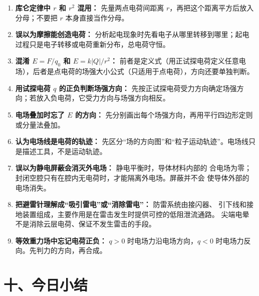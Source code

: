 \begin{mistakebox}
\begin{enumerate}
  \item \textbf{库仑定律中 $r$ 和 $r^2$ 混用：} 先量两点电荷间距离 $r$，再把这个距离平方后放入分母；不要把 $r$ 本身直接当作分母。

  \item \textbf{误以为摩擦能创造电荷：} 分析起电现象时先看电子从哪里转移到哪里；起电过程只是电子转移或电荷重新分布，总电荷守恒。

  \item \textbf{混淆 $E = F/q_0$ 和 $E = k|Q|/r^2$：} 前者是定义式（用正试探电荷定义任意电场），后者是点电荷的场强大小公式（只适用于点电荷），方向还要单独判断。

  \item \textbf{用试探电荷 $q$ 的正负判断场强方向：} 先按正试探电荷受力方向确定场强方向；若放入负电荷，它受力方向与场强方向相反。

  \item \textbf{电场叠加时忘了 $E$ 的方向：} 先分别画出每个场强方向，再用平行四边形定则或分量法叠加。

  \item \textbf{认为电场线是电荷的轨迹：} 先区分“场的方向图”和“粒子运动轨迹”。电场线只是描述工具，不是运动轨迹。

  \item \textbf{误以为静电屏蔽会消灭外电场：} 静电平衡时，导体材料内部的
  合电场为零；封闭空腔只有在腔内无电荷时，才能隔离外电场。屏蔽并不会
  使导体外部的电场消失。

  \item \textbf{把避雷针理解成“吸引雷电”或“消除雷电”：} 防雷系统由接闪器、
  引下线和接地装置组成，主要作用是在雷击发生时提供可控的低阻泄流通路。
  尖端电晕不是消除云层电荷、保证不发生雷击的手段。

  \item \textbf{等效重力场中忘记电荷正负：} $q>0$ 时电场力沿电场方向，$q<0$ 时电场力反向。先判力的方向，再合成。
\end{enumerate}
\end{mistakebox}

\section*{十、今日小结}

